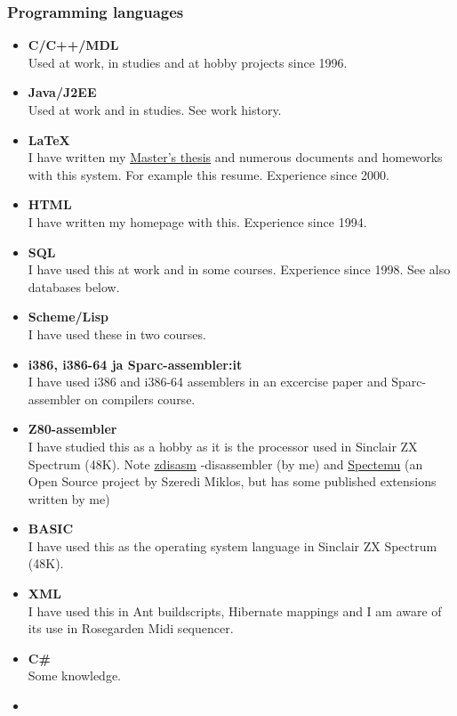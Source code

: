 \documentclass[a4paper,12pt]{article}
\begin{document}
\subsubsection*{Programming languages}
\begin{itemize}
\item
{\bf C/C++/MDL} \\
Used at work, in studies and at hobby projects since 1996.
\item
{\bf Java/J2EE} \\
Used at work and in studies. See work history.
\item
{\bf LaTeX} \\
I have written my \href{http://math.tkk.fi/~mnummeli/tutkimus/diplomityo.pdf}
{Master's thesis} and numerous documents and homeworks with
this system. For example this resume. Experience since 2000.
\item
{\bf HTML} \\
I have written my homepage with this. Experience since 1994.
\item
{\bf SQL} \\
I have used this at work and in some courses. Experience since 1998.
See also databases below.
\item
{\bf Scheme/Lisp} \\
I have used these in two courses.
\item
{\bf i386, i386-64 ja Sparc-assembler:it} \\
I have used i386 and i386-64 assemblers in an excercise paper and
Sparc-assembler on compilers course.
\item
{\bf Z80-assembler} \\
I have studied this as a hobby as it is the processor used in
Sinclair ZX Spectrum (48K). Note 
\href{http://math.tkk.fi/~mnummeli/tite/spectrum/zdisasm.en.html}{zdisasm}
-disassembler (by me) and 
\href{http://www.inf.bme.hu/~mszeredi/spectemu/spectemu.html#pre}{Spectemu}
(an Open Source project by Szeredi Miklos,
but has some published extensions written by me)
\item
{\bf BASIC} \\
I have used this as the operating system language in Sinclair ZX Spectrum (48K).
\item
{\bf XML} \\
I have used this in Ant buildscripts, Hibernate mappings and I am aware of its
use in Rosegarden Midi sequencer.
\item
{\bf C\#} \\
Some knowledge.
\item

\end{itemize}
\end{document}
